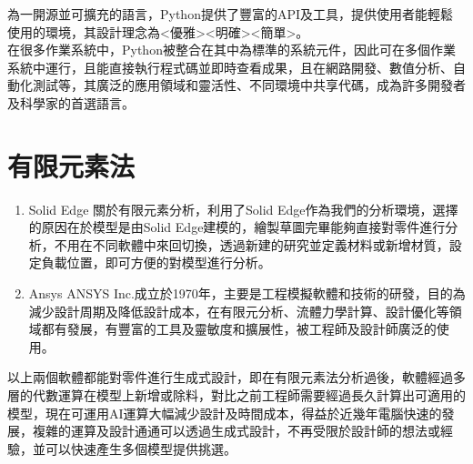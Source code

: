 為一開源並可擴充的語言，Python提供了豐富的API及工具，提供使用者能輕鬆使用的環境，其設計理念為<優雅><明確><簡單>。\\
在很多作業系統中，Python被整合在其中為標準的系統元件，因此可在多個作業系統中運行，且能直接執行程式碼並即時查看成果，且在網路開發、數值分析、自動化測試等，其廣泛的應用領域和靈活性、不同環境中共享代碼，成為許多開發者及科學家的首選語言。\\

\section{有限元素法}
\begin{enumerate}
\item Solid Edge
關於有限元素分析，利用了Solid Edge作為我們的分析環境，選擇的原因在於模型是由Solid Edge建模的，繪製草圖完畢能夠直接對零件進行分析，不用在不同軟體中來回切換，透過新建的研究並定義材料或新增材質，設定負載位置，即可方便的對模型進行分析。\
\item Ansys
ANSYS Inc.成立於1970年，主要是工程模擬軟體和技術的研發，目的為減少設計周期及降低設計成本，在有限元分析、流體力學計算、設計優化等領域都有發展，有豐富的工具及靈敏度和擴展性，被工程師及設計師廣泛的使用。\\
\end{enumerate}
以上兩個軟體都能對零件進行生成式設計，即在有限元素法分析過後，軟體經過多層的代數運算在模型上新增或除料，對比之前工程師需要經過長久計算出可適用的模型，現在可運用AI運算大幅減少設計及時間成本，得益於近幾年電腦快速的發展，複雜的運算及設計通通可以透過生成式設計，不再受限於設計師的想法或經驗，並可以快速產生多個模型提供挑選。\
\newpage
